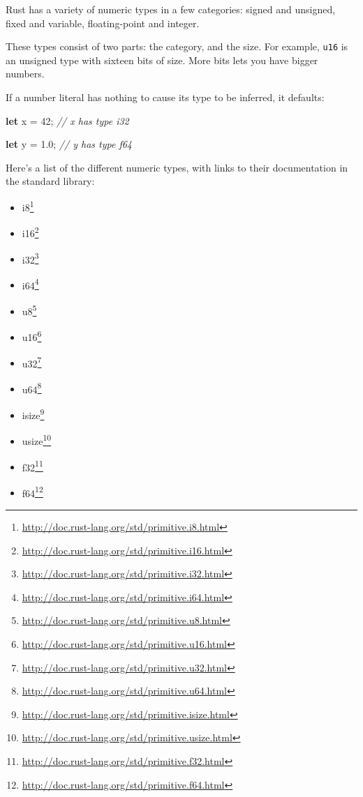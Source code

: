 \documentclass[a4paper,]{book}
\newenvironment{Shaded}{\begin{snugshade}}{\end{snugshade}}
\newcommand{\KeywordTok}[1]{\textcolor[rgb]{0.13,0.29,0.53}{\textbf{{#1}}}}
\newcommand{\DecValTok}[1]{\textcolor[rgb]{0.00,0.00,0.81}{{#1}}}
\newcommand{\CommentTok}[1]{\textcolor[rgb]{0.56,0.35,0.01}{\textit{{#1}}}}
\newcommand{\NormalTok}[1]{{#1}}
\renewcommand{\href}[2]{#2\footnote{\url{#1}}}
\providecommand{\tightlist}{%
  \setlength{\itemsep}{0pt}\setlength{\parskip}{0pt}}
\begin{document}

Rust has a variety of numeric types in a few categories: signed and
unsigned, fixed and variable, floating-point and integer.

These types consist of two parts: the category, and the size. For
example, \texttt{u16} is an unsigned type with sixteen bits of size.
More bits lets you have bigger numbers.

If a number literal has nothing to cause its type to be inferred, it
defaults:

\begin{Shaded}
\begin{Highlighting}[]
\KeywordTok{let} \NormalTok{x = }\DecValTok{42}\NormalTok{; }\CommentTok{// x has type i32}

\KeywordTok{let} \NormalTok{y = }\DecValTok{1.0}\NormalTok{; }\CommentTok{// y has type f64}
\end{Highlighting}
\end{Shaded}

Here's a list of the different numeric types, with links to their
documentation in the standard library:

\begin{itemize}
\tightlist
\item
  \href{http://doc.rust-lang.org/std/primitive.i8.html}{i8}
\item
  \href{http://doc.rust-lang.org/std/primitive.i16.html}{i16}
\item
  \href{http://doc.rust-lang.org/std/primitive.i32.html}{i32}
\item
  \href{http://doc.rust-lang.org/std/primitive.i64.html}{i64}
\item
  \href{http://doc.rust-lang.org/std/primitive.u8.html}{u8}
\item
  \href{http://doc.rust-lang.org/std/primitive.u16.html}{u16}
\item
  \href{http://doc.rust-lang.org/std/primitive.u32.html}{u32}
\item
  \href{http://doc.rust-lang.org/std/primitive.u64.html}{u64}
\item
  \href{http://doc.rust-lang.org/std/primitive.isize.html}{isize}
\item
  \href{http://doc.rust-lang.org/std/primitive.usize.html}{usize}
\item
  \href{http://doc.rust-lang.org/std/primitive.f32.html}{f32}
\item
  \href{http://doc.rust-lang.org/std/primitive.f64.html}{f64}
\end{itemize}
\end{document}
